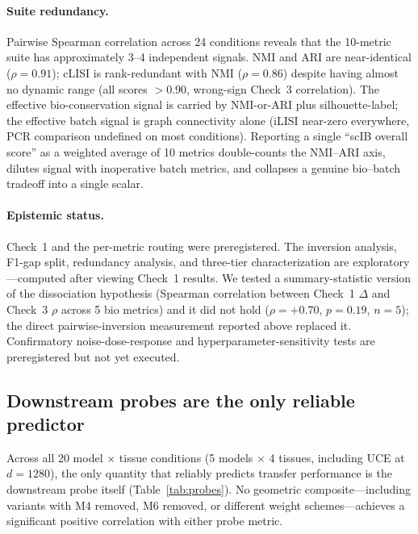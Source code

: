 \documentclass[9pt,lineno]{elife}
\begin{document}
\paragraph{Suite redundancy.} Pairwise Spearman correlation across 24 conditions reveals that the 10-metric suite has approximately 3--4 independent signals. NMI and ARI are near-identical ($\rho = 0.91$); cLISI is rank-redundant with NMI ($\rho = 0.86$) despite having almost no dynamic range (all scores $> 0.90$, wrong-sign Check~3 correlation). The effective bio-conservation signal is carried by NMI-or-ARI plus silhouette-label; the effective batch signal is graph connectivity alone (iLISI near-zero everywhere, PCR comparison undefined on most conditions). Reporting a single ``scIB overall score'' as a weighted average of 10 metrics double-counts the NMI--ARI axis, dilutes signal with inoperative batch metrics, and collapses a genuine bio--batch tradeoff into a single scalar.

\paragraph{Epistemic status.} Check~1 and the per-metric routing were preregistered. The inversion analysis, F1-gap split, redundancy analysis, and three-tier characterization are exploratory---computed after viewing Check~1 results. We tested a summary-statistic version of the dissociation hypothesis (Spearman correlation between Check~1 $\Delta$ and Check~3 $\rho$ across 5 bio metrics) and it did not hold ($\rho = +0.70$, $p = 0.19$, $n = 5$); the direct pairwise-inversion measurement reported above replaced it. Confirmatory noise-dose-response and hyperparameter-sensitivity tests are preregistered but not yet executed.


\subsection{Downstream probes are the only reliable predictor}

Across all 20 model $\times$ tissue conditions (5 models $\times$ 4 tissues, including UCE at $d = 1280$), the only quantity that reliably predicts transfer performance is the downstream probe itself (Table~\ref{tab:probes}). No geometric composite---including variants with M4 removed, M6 removed, or different weight schemes---achieves a significant positive correlation with either probe metric.
\end{document}
